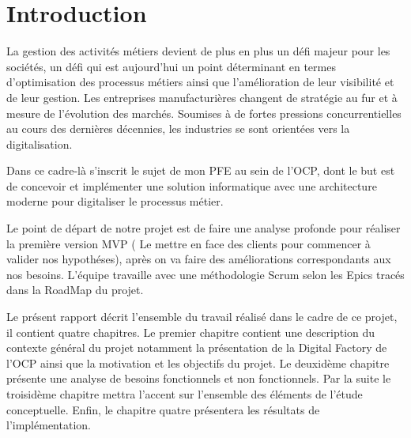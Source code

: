 \chapter{Introduction}


La gestion des activit\'es m\'etiers devient de plus en plus un d\'efi majeur pour les soci\'et\'es, un d\'efi qui est aujourd'hui un point d\'eterminant en termes d'optimisation des processus m\'etiers ainsi que l'am\'elioration de leur visibilit\'e et de leur gestion. Les entreprises manufacturi\`eres changent de strat\'egie au fur et \`a mesure de l'\'evolution des march\'es. Soumises \`a de fortes pressions concurrentielles au cours des derni\`eres d\'ecennies, les industries se sont orient\'ees vers la digitalisation.

Dans ce cadre-l\`a s'inscrit le sujet de mon \gls{PFE} au sein de l'\gls{OCP}, dont le but est de concevoir et impl\'ementer une solution informatique avec une architecture moderne pour digitaliser le processus m\'etier.

Le point de d\'epart de notre projet est de faire une analyse profonde pour r\'ealiser la premi\`ere version \gls{MVP} ( Le mettre en face des clients pour commencer \`a valider nos hypoth\'eses), apr\`es on va faire des am\'eliorations correspondants aux nos besoins. L'\'equipe  travaille avec une m\'ethodologie Scrum selon les Epics trac\'es dans la RoadMap du projet.

Le pr\'esent rapport d\'ecrit l'ensemble du travail r\'ealis\'e dans le cadre de ce projet, il contient quatre chapitres. Le premier chapitre contient une description du contexte g\'en\'eral du projet notamment la pr\'esentation de la Digital Factory de l'\gls{OCP} ainsi que la motivation et les objectifs du projet. Le deuxid\`eme chapitre pr\'esente une analyse de besoins fonctionnels et non fonctionnels. Par la suite le troisid\`eme chapitre mettra l'accent sur l'ensemble des \'el\'ements de l'\'etude conceptuelle. Enfin, le chapitre quatre pr\'esentera les r\'esultats de l'impl\'ementation.